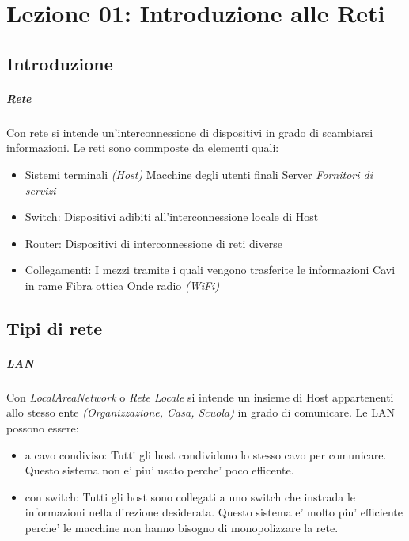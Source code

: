 \chapter{Lezione 01: Introduzione alle Reti}

\section{Introduzione}

\paragraph{Rete}

Con rete si intende un'interconnessione di dispositivi in grado di scambiarsi informazioni.
Le reti sono commposte da elementi quali:
\begin{itemize}
    \item Sistemi terminali \textit{(Host)}
    \subitem Macchine degli utenti finali
    \subitem Server \textit{Fornitori di servizi}
    \item Switch: Dispositivi adibiti all'interconnessione locale di Host
    \item Router: Dispositivi di interconnessione di reti diverse
    \item Collegamenti: I mezzi tramite i quali vengono trasferite le informazioni
    \subitem Cavi in rame
    \subitem Fibra ottica
    \subitem Onde radio \textit{(WiFi)}
\end{itemize}

\section{Tipi di rete}
\paragraph{LAN}
Con \textit{LocalAreaNetwork} o \textit{Rete Locale} si intende un insieme di Host appartenenti allo stesso ente \textit{(Organizzazione, Casa, Scuola)} in grado di comunicare.\newline
Le LAN possono essere:
\begin{itemize}
    \item a cavo condiviso: Tutti gli host condividono lo stesso cavo per comunicare.
    Questo sistema non e' piu' usato perche' poco efficente.
    \item con switch: Tutti gli host sono collegati a uno switch che instrada le informazioni nella direzione desiderata.
    Questo sistema e' molto piu' efficiente perche' le macchine non hanno bisogno di monopolizzare la rete.
\end{itemize}
